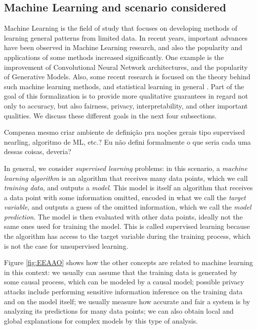 \subsection{Machine Learning and scenario considered}

Machine Learning is the field of study that focuses on developing methods of learning general patterns from limited data. In recent years, important advances have been observed in Machine Learning research, and also the popularity and applications of some methods increased significantly. One example is the improvement of Convolutional Neural Network architectures, and the popularity of Generative Models. Also, some recent research is focused on the theory behind such machine learning methods\cite{SAAMAP}\cite{grohs2022mathematical}, and statistical learning in general \cite{Vapnik}. Part of the goal of this formalization is to provide more qualitative guarantees in regard not only to accuracy, but also fairness, privacy, interpretability, and other important qualities. We discuss these different goals in the next four subsections.

{\color{orange} Compensa mesmo criar ambiente de definição pra noções gerais tipo supervised nearling, algoritmo de ML, etc.? Eu não defini formalmente o que seria cada uma dessas coisas, deveria?}

In general, we consider \emph{supervised learning} problems: in this scenario, a \emph{machine learning algorithm} is an algorithm that receives many data points, which we call \emph{training data}, and outputs a \emph{model}. This model is itself an algorithm that receives a data point with some information omitted, encoded in what we call the \emph{target variable}, and outputs a guess of the omitted information, which we call the \emph{model prediction}. The model is then evaluated with other data points, ideally not the same ones used for training the model. This is called supervised learning because the algorithm has access to the target variable during the training process, which is not the case for unsupervised learning.

Figure \ref{fig:EEAAO} shows how the other concepts are related to machine learning in this context: we usually can assume that the training data is generated by some causal process, which can be modeled by a causal model; possible privacy attacks include performing sensitive information inference on the training data and on the model itself; we usually measure how accurate and fair a system is by analyzing its predictions for many data points; we can also obtain local and global explanations for complex models by this type of analysis.

